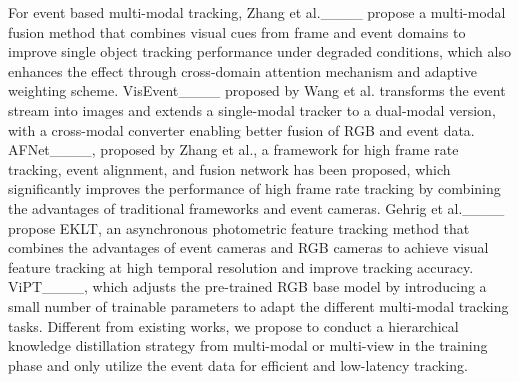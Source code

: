 For event based multi-modal tracking, Zhang et al.____ propose a multi-modal fusion method that combines visual cues from frame and event domains to improve single object tracking performance under degraded conditions, which also enhances the effect through cross-domain attention mechanism and adaptive weighting scheme. 
VisEvent____ proposed by Wang et al. transforms the event stream into images and extends a single-modal tracker to a dual-modal version, with a cross-modal converter enabling better fusion of RGB and event data. 
AFNet____, proposed by Zhang et al., a framework for high frame rate tracking, event alignment, and fusion network has been proposed, which significantly improves the performance of high frame rate tracking by combining the advantages of traditional frameworks and event cameras.  
Gehrig et al.____ propose EKLT, an asynchronous photometric feature tracking method that combines the advantages of event cameras and RGB cameras to achieve visual feature tracking at high temporal resolution and improve tracking accuracy. 
ViPT____, which adjusts the pre-trained RGB base model by introducing a small number of trainable parameters to adapt the different multi-modal tracking tasks. 
Different from existing works, we propose to conduct a hierarchical knowledge distillation strategy from multi-modal or multi-view in the training phase and only utilize the event data for efficient and low-latency tracking. 




